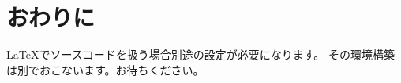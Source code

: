 \documentclass[dvipdfmx]{jsarticle}
\begin{document}


\section{おわりに}

LaTeXでソースコードを扱う場合別途の設定が必要になります。
その環境構築は別でおこないます。お待ちください。
\end{document}
